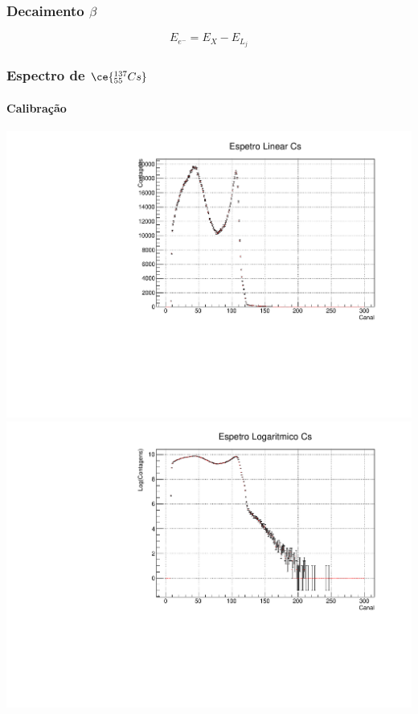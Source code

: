 \documentclass[10pt]{beamer}
\begin{document}
\begin{frame}
\frametitle{Decaimento $\beta$}

\begin{equation}
E_{e^-}=E_{X} -E_{L_{j}}
\label{Ee}
\end{equation}

\end{frame}


\begin{frame}

\frametitle{Espectro de $\ce{^{137}_{55}Cs}$}\framesubtitle{Calibração}

   \centering
   \includegraphics[scale=0.25]{esplincs.pdf}
   \includegraphics[scale=0.25]{esplogcs.pdf}

\end{frame}
\end{document}
